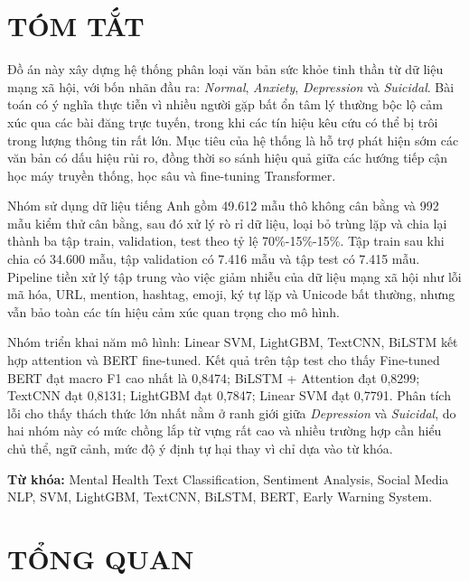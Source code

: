 \documentclass[12pt,a4paper,oneside]{report}
\newlength{\manualparindent}
\newcommand{\manualindent}{\hspace*{\manualparindent}}
\begin{document}
\chapter*{TÓM TẮT}

\manualindent%
Đồ án này xây dựng hệ thống phân loại văn bản sức khỏe tinh thần từ dữ liệu mạng xã hội, với bốn nhãn đầu ra: \textit{Normal}, \textit{Anxiety}, \textit{Depression} và \textit{Suicidal}. Bài toán có ý nghĩa thực tiễn vì nhiều người gặp bất ổn tâm lý thường bộc lộ cảm xúc qua các bài đăng trực tuyến, trong khi các tín hiệu kêu cứu có thể bị trôi trong lượng thông tin rất lớn. Mục tiêu của hệ thống là hỗ trợ phát hiện sớm các văn bản có dấu hiệu rủi ro, đồng thời so sánh hiệu quả giữa các hướng tiếp cận học máy truyền thống, học sâu và fine-tuning Transformer.

\manualindent%
Nhóm sử dụng dữ liệu tiếng Anh gồm 49.612 mẫu thô không cân bằng và 992 mẫu kiểm thử cân bằng, sau đó xử lý rò rỉ dữ liệu, loại bỏ trùng lặp và chia lại thành ba tập train, validation, test theo tỷ lệ 70\%-15\%-15\%. Tập train sau khi chia có 34.600 mẫu, tập validation có 7.416 mẫu và tập test có 7.415 mẫu. Pipeline tiền xử lý tập trung vào việc giảm nhiễu của dữ liệu mạng xã hội như lỗi mã hóa, URL, mention, hashtag, emoji, ký tự lặp và Unicode bất thường, nhưng vẫn bảo toàn các tín hiệu cảm xúc quan trọng cho mô hình.

\manualindent%
Nhóm triển khai năm mô hình: Linear SVM, LightGBM, TextCNN, BiLSTM kết hợp attention và BERT fine-tuned. Kết quả trên tập test cho thấy Fine-tuned BERT đạt macro F1 cao nhất là 0,8474; BiLSTM + Attention đạt 0,8299; TextCNN đạt 0,8131; LightGBM đạt 0,7847; Linear SVM đạt 0,7791. Phân tích lỗi cho thấy thách thức lớn nhất nằm ở ranh giới giữa \textit{Depression} và \textit{Suicidal}, do hai nhóm này có mức chồng lắp từ vựng rất cao và nhiều trường hợp cần hiểu chủ thể, ngữ cảnh, mức độ ý định tự hại thay vì chỉ dựa vào từ khóa.

\manualindent%
\textbf{Từ khóa:} Mental Health Text Classification, Sentiment Analysis, Social Media NLP, SVM, LightGBM, TextCNN, BiLSTM, BERT, Early Warning System.

\chapter{TỔNG QUAN}
\end{document}
